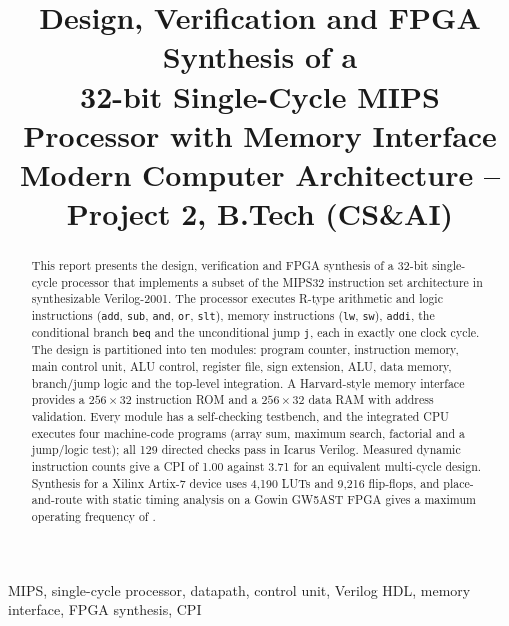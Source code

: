 \documentclass[conference]{IEEEtran}
\begin{document}
\sloppy
\setlength{\emergencystretch}{2em}

\title{Design, Verification and FPGA Synthesis of a\\
32-bit Single-Cycle MIPS Processor with Memory Interface\\[4pt]
\large Modern Computer Architecture -- Project 2, B.Tech (CS\&AI)}

\author{
}

\maketitle

\begin{abstract}
This report presents the design, verification and FPGA synthesis of a 32-bit
single-cycle processor that implements a subset of the MIPS32 instruction set
architecture in synthesizable Verilog-2001. The processor executes R-type
arithmetic and logic instructions (\texttt{add}, \texttt{sub}, \texttt{and},
\texttt{or}, \texttt{slt}), memory instructions (\texttt{lw}, \texttt{sw}),
\texttt{addi}, the conditional branch \texttt{beq} and the unconditional jump
\texttt{j}, each in exactly one clock cycle. The design is partitioned into
ten modules: program counter, instruction memory, main control unit, ALU
control, register file, sign extension, ALU, data memory, branch/jump logic and
the top-level integration. A Harvard-style memory interface provides a
$256\times32$ instruction ROM and a $256\times32$ data RAM with address
validation. Every module has a self-checking testbench, and the integrated CPU
executes four machine-code programs (array sum, maximum search, factorial and a
jump/logic test); all 129 directed checks pass in Icarus Verilog. Measured
dynamic instruction counts give a CPI of 1.00 against 3.71 for an equivalent
multi-cycle design. Synthesis for a Xilinx Artix-7 device uses 4{,}190 LUTs and
9{,}216 flip-flops, and place-and-route with static timing analysis on a Gowin GW5AST
FPGA gives a maximum operating frequency of \fmaxvalue.
\end{abstract}

\begin{IEEEkeywords}
MIPS, single-cycle processor, datapath, control unit, Verilog HDL,
memory interface, FPGA synthesis, CPI
\end{IEEEkeywords}
\end{document}
